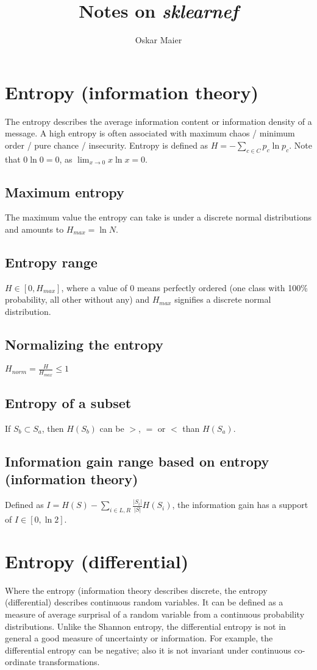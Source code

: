 \documentclass[10pt,a4paper]{article}
\author{Oskar Maier}
\title{Notes on \textit{sklearnef}}
\begin{document}
\maketitle

\section{Entropy (information theory)}
The entropy describes the average information content or information density of a message. A high entropy is often associated with maximum chaos / minimum order / pure chance / insecurity.
Entropy is defined as $H = -\sum_{c\in C}p_c \ln p_c$. Note that $0 \ln 0 = 0$, as $\lim_{x\to 0}x \ln x = 0$.

\subsection{Maximum entropy}
The maximum value the entropy can take is under a discrete normal distributions and amounts to $H_{max} = \ln N$.

\subsection{Entropy range}
$H \in [0, H_{max}]$, where a value of $0$ means perfectly ordered (one class with 100\% probability, all other without any) and $H_{max}$ signifies a discrete normal distribution.

\subsection{Normalizing the entropy}
$H_{norm} = \frac{H}{H_{max}} \leq 1$

\subsection{Entropy of a subset}
If $S_b \subset S_a$, then $H(S_b)$ can be $>$, $=$ or $<$ than $H(S_a)$.

\subsection{Information gain range based on entropy (information theory)}
Defined as $I = H(S) - \sum_{i\in{L,R}}\frac{|S_i|}{|S|}H(S_i)$, the information gain has a support of $I \in [0, \ln 2]$.


\section{Entropy (differential)}
Where the entropy (information theory describes discrete, the entropy (differential) describes continuous random variables. It can be defined as a measure of average surprisal of a random variable from a continuous probability distributions. Unlike the Shannon entropy, the differential entropy is not in general a good measure of uncertainty or information. For example, the differential entropy can be negative; also it is not invariant under continuous co-ordinate transformations.
\end{document}
